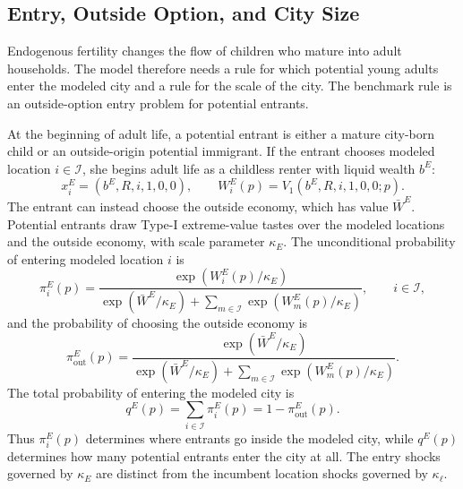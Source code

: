 \documentclass[11pt]{article}
\newcommand{\Iset}{\mathcal I}
\begin{document}
\subsection{Entry, Outside Option, and City Size}
Endogenous fertility changes the flow of children who mature into adult households. The model therefore needs a rule for which potential young adults enter the modeled city and a rule for the scale of the city. The benchmark rule is an outside-option entry problem for potential entrants.

At the beginning of adult life, a potential entrant is either a mature city-born child or an outside-origin potential immigrant. If the entrant chooses modeled location $i\in\Iset$, she begins adult life as a childless renter with liquid wealth $b^E$:
\begin{equation*}
    x_i^E=(b^E,R,i,1,0,0),
    \qquad
    W_i^E(p)=V_1(b^E,R,i,1,0,0;p).
\end{equation*}
The entrant can instead choose the outside economy, which has value $\bar W^E$. Potential entrants draw Type-I extreme-value tastes over the modeled locations and the outside economy, with scale parameter $\kappa_E$. The unconditional probability of entering modeled location $i$ is
\begin{equation}
    \pi_i^E(p)
    =
    \frac{
    \exp\left(W_i^E(p)/\kappa_E\right)
    }{
    \exp\left(\bar W^E/\kappa_E\right)
    +
    \sum_{m\in\Iset}\exp\left(W_m^E(p)/\kappa_E\right)
    },
    \qquad i\in\Iset,
    \label{eq:entry_location_probs}
\end{equation}
and the probability of choosing the outside economy is
\begin{equation}
    \pi_{\mathrm{out}}^E(p)
    =
    \frac{
    \exp\left(\bar W^E/\kappa_E\right)
    }{
    \exp\left(\bar W^E/\kappa_E\right)
    +
    \sum_{m\in\Iset}\exp\left(W_m^E(p)/\kappa_E\right)
    }.
    \label{eq:entry_outside_prob}
\end{equation}
The total probability of entering the modeled city is
\begin{equation}
    q^E(p)
    =
    \sum_{i\in\Iset}\pi_i^E(p)
    =
    1-\pi_{\mathrm{out}}^E(p).
    \label{eq:metro_entry_prob}
\end{equation}
Thus $\pi_i^E(p)$ determines where entrants go inside the modeled city, while $q^E(p)$ determines how many potential entrants enter the city at all. The entry shocks governed by $\kappa_E$ are distinct from the incumbent location shocks governed by $\kappa_\ell$.
\end{document}
